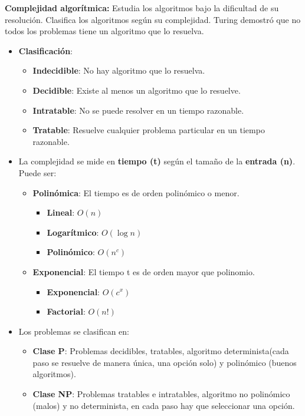 \documentclass[12pt, twoside, openright]{report} %
\begin{document}
\textbf{Complejidad algorítmica:} Estudia los algoritmos bajo la dificultad de su resolución. Clasifica los algoritmos según su complejidad. Turing demostró que no todos los problemas tiene un algoritmo que lo resuelva.
\begin{itemize}
	\item \textbf{Clasificación}:
	      \begin{itemize}
		      \item \textbf{Indecidible}: No hay algoritmo que lo resuelva.
		      \item \textbf{Decidible}: Existe al menos un algoritmo que lo resuelve.
		      \item \textbf{Intratable}: No se puede resolver en un tiempo razonable.
		      \item \textbf{Tratable}: Resuelve cualquier problema particular en un tiempo razonable.
	      \end{itemize}
	\item La complejidad se mide en \textbf{tiempo (t)} según el tamaño de la
	      \textbf{entrada (n)}. Puede ser:
	      \begin{itemize}
		      \item \textbf{Polinómica}: El tiempo es de orden polinómico o menor.
		            \begin{itemize}
			            \item \textbf{Lineal}: $O(n)$
			            \item \textbf{Logarítmico}: $O(\log n)$
			            \item \textbf{Polinómico}: $O(n^c)$
		            \end{itemize}
		      \item \textbf{Exponencial}: El tiempo t es de orden mayor que polinomio.
		            \begin{itemize}
			            \item \textbf{Exponencial}: $O(c^x)$
			            \item \textbf{Factorial}: $O(n!)$
		            \end{itemize}
	      \end{itemize}
	\item Los problemas se clasifican en:
	      \begin{itemize}
		      \item \textbf{Clase P}: Problemas decidibles, tratables, algoritmo determinista(cada paso se resuelve de manera única, una opción solo) y polinómico (buenos algoritmos).
		      \item \textbf{Clase NP}: Problemas tratables e intratables, algoritmo no polinómico (malos) y no determinista, en cada paso hay que seleccionar una opción.
	      \end{itemize}
\end{itemize}
\pagebreak
\end{document}
